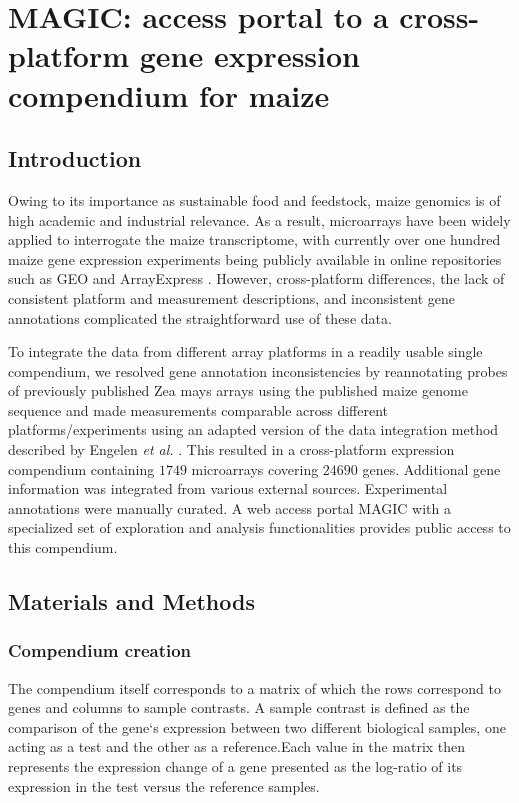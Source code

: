 \chapter{MAGIC: access portal to a cross-platform gene expression compendium for maize}\label{ch:magic}


\instructionsintroduction



\section{Introduction}
Owing to its importance as sustainable food and feedstock, maize genomics is of high academic and industrial relevance. As a result, microarrays have been widely applied to interrogate the maize transcriptome, with currently over one hundred maize gene expression  experiments being publicly available in online repositories such as GEO \cite{Barrett2011} and ArrayExpress \cite{Parkinson2009}.  However, cross-platform differences, the lack of consistent platform and measurement descriptions, and inconsistent  gene annotations complicated the straightforward use of these data.

To integrate the data from different array platforms in a readily usable single compendium, we resolved gene annotation inconsistencies by reannotating probes of previously published Zea mays arrays using the published maize genome sequence \cite{Schnable2009}  and made measurements comparable across different platforms/experiments using an adapted version of the data integration method described by Engelen \textit{et al.}  \cite{Engelen2011}. This resulted in a cross-platform expression compendium containing  $1749$ microarrays covering $24690$ genes. Additional gene information was integrated from various external sources. Experimental annotations were manually curated. A web access portal MAGIC with a specialized set of exploration and analysis functionalities provides public access to this compendium.


\section{Materials and Methods}

\subsection{Compendium creation}

The compendium itself corresponds to a matrix of which the rows correspond to genes and columns to sample contrasts. A sample contrast is defined as the comparison of the gene`s expression between two different biological samples, one acting as a test and the other as a reference.Each value in the matrix then represents the expression change of a gene presented  as the log-ratio of its expression in the test versus the reference samples. 

